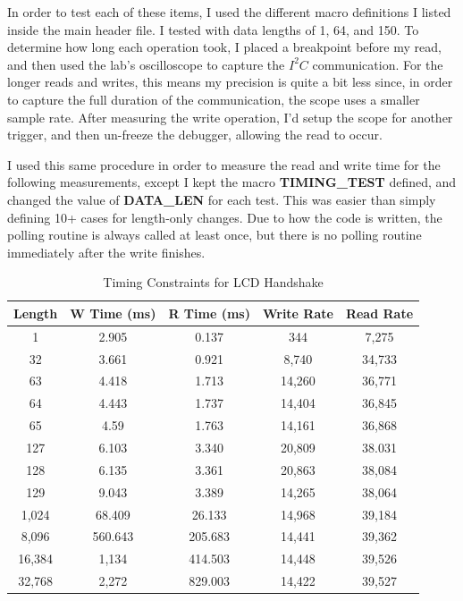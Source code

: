 \documentclass[a4paper, 12pt]{article}
\begin{document}
In order to test each of these items, I used the different macro definitions I listed inside the main header file. I tested with data lengths of 1, 64, and 150. To determine how long each operation took, I placed a breakpoint before my read, and then used the lab's oscilloscope to capture the $I^2C$ communication. For the longer reads and writes, this means my precision is quite a bit less since, in order to capture the full duration of the communication, the scope uses a smaller sample rate. After measuring the write operation, I'd setup the scope for another trigger, and then un-freeze the debugger, allowing the read to occur.

I used this same procedure in order to measure the read and write time for the following measurements, except I kept the macro \textbf{TIMING\_TEST} defined, and changed the value of \textbf{DATA\_LEN} for each test. This was easier than simply defining 10+ cases for length-only changes. Due to how the code is written, the polling routine is always called at least once, but there is no polling routine immediately after the write finishes. 

\begin{table}[ht]
\centering
\begin{tabular}{c|c|c|c|c}
\textbf{Length} & \textbf{W Time (ms)} & \textbf{R Time (ms)} & \textbf{Write Rate} & \textbf{Read Rate} \\
\hline
1 & 2.905 & 0.137 & 344 & 7,275 \\
32 & 3.661 & 0.921 & 8,740 & 34,733 \\
63 & 4.418 & 1.713 & 14,260 & 36,771 \\
64 & 4.443 & 1.737 & 14,404 & 36,845 \\
65 & 4.59 & 1.763 & 14,161 & 36,868 \\
127 & 6.103 & 3.340 & 20,809 & 38.031 \\
128 & 6.135 & 3.361 & 20,863 & 38,084 \\
129 & 9.043 & 3.389 & 14,265 & 38,064 \\
1,024 & 68.409 & 26.133 & 14,968 & 39,184 \\
8,096 & 560.643 & 205.683 & 14,441 & 39,362 \\
16,384 & 1,134 & 414.503 & 14,448 & 39,526 \\
32,768 & 2,272 & 829.003 & 14,422 & 39,527 \\
\end{tabular}
\caption{Timing Constraints for LCD Handshake}
\end{table}
\end{document}
